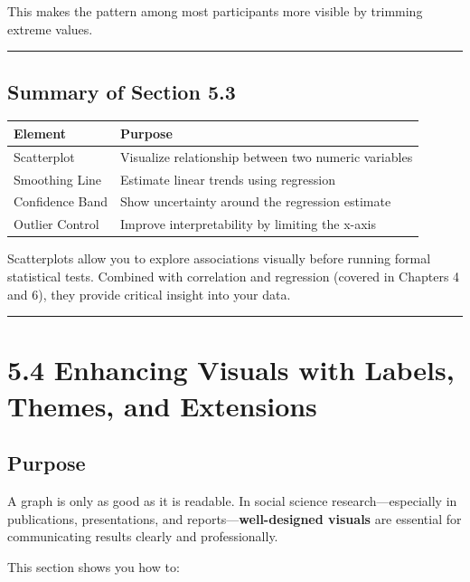 \documentclass[
]{book}
\begin{document}
This makes the pattern among most participants more visible by trimming extreme values.

\begin{center}\rule{0.5\linewidth}{0.5pt}\end{center}

\subsection{Summary of Section 5.3}\label{summary-of-section-5.3}

\begin{longtable}[]{@{}ll@{}}
\toprule\noalign{}
Element & Purpose \\
\midrule\noalign{}
\endhead
\bottomrule\noalign{}
\endlastfoot
Scatterplot & Visualize relationship between two numeric variables \\
Smoothing Line & Estimate linear trends using regression \\
Confidence Band & Show uncertainty around the regression estimate \\
Outlier Control & Improve interpretability by limiting the x-axis \\
\end{longtable}

Scatterplots allow you to explore associations visually before running formal statistical tests. Combined with correlation and regression (covered in Chapters 4 and 6), they provide critical insight into your data.

\begin{center}\rule{0.5\linewidth}{0.5pt}\end{center}

\section{5.4 Enhancing Visuals with Labels, Themes, and Extensions}\label{enhancing-visuals-with-labels-themes-and-extensions}

\subsection{Purpose}\label{purpose-3}

A graph is only as good as it is readable. In social science research---especially in publications, presentations, and reports---\textbf{well-designed visuals} are essential for communicating results clearly and professionally.

This section shows you how to:
\end{document}
